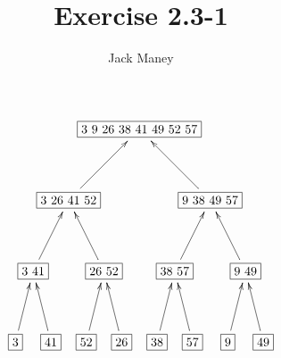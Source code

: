 \documentclass{article}
\begin{document}
\title{Exercise 2.3-1}
\author{Jack Maney}
\maketitle


\[
\xygraph{
!{<0cm,0cm>;<1cm,0cm>:<0cm,1cm>::}
!{(0,0)}*+{\fbox{3}}="a"
!{(1,0)}*+{\fbox{41}}="b"
!{(2,0)}*+{\fbox{52}}="c"
!{(3,0)}*+{\fbox{26}}="d"
!{(4,0)}*+{\fbox{38}}="e"
!{(5,0)}*+{\fbox{57}}="f"
!{(6,0)}*+{\fbox{9}}="g"
!{(7,0)}*+{\fbox{49}}="h"
!{(0.5,2)}*+{\fbox{3 41}}="ab"
!{(2.5,2)}*+{\fbox{26 52}}="cd"
!{(4.5,2)}*+{\fbox{38 57}}="ef"
!{(6.5,2)}*+{\fbox{9 49}}="gh"
!{(1.5,4)}*+{\fbox{3 26 41 52}}="abcd"
!{(5.5,4)}*+{\fbox{9 38 49 57}}="efgh"
!{(3.5,6)}*+{\fbox{3 9 26 38 41 49 52 57}}="abcdefgh"
"a":"ab" "b":"ab" "c":"cd" "d":"cd"
"e":"ef" "f":"ef" "g":"gh" "h":"gh"
"ab":"abcd" "cd":"abcd" "ef":"efgh" "gh":"efgh"
"abcd":"abcdefgh" 
"efgh":"abcdefgh"
}
\]
\end{document}
